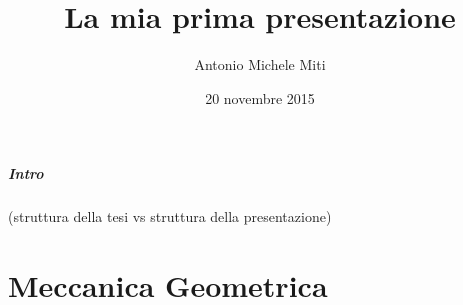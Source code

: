 \documentclass{beamer}
\title{La mia prima presentazione}
\author{Antonio Michele Miti}
\date{20 novembre 2015}
\begin{document}
	\begin{frame}
		\maketitle
	\end{frame}
	
	\begin{frame}
		\frametitle{Intro}
		(struttura della tesi vs struttura della presentazione)
	\end{frame}
	

	\part{Meccanica Geometrica}
		\frame{\partpage}
	
\end{document}
